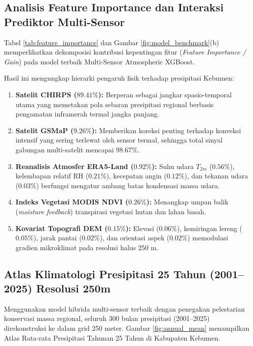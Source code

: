 \documentclass[11pt,a4paper,titlepage]{article}
\begin{document}
\subsection{Analisis Feature Importance dan Interaksi Prediktor Multi-Sensor}
Tabel \ref{tab:feature_importance} dan Gambar \ref{fig:model_benchmark}(b) memperlihatkan dekomposisi kontribusi kepentingan fitur (\textit{Feature Importance / Gain}) pada model terbaik Multi-Sensor Atmospheric XGBoost.



Hasil ini mengungkap hierarki pengaruh fisik terhadap presipitasi Kebumen:
\begin{enumerate}
    \item \textbf{Satelit CHIRPS ($89.41\%$):} Berperan sebagai jangkar spasio-temporal utama yang memetakan pola sebaran presipitasi regional berbasis pengamatan inframerah termal jangka panjang.
    \item \textbf{Satelit GSMaP ($9.26\%$):} Memberikan koreksi penting terhadap konveksi intensif yang sering terlewat oleh sensor termal, sehingga total sinyal gabungan multi-satelit mencapai $98.67\%$.
    \item \textbf{Reanalisis Atmosfer ERA5-Land ($0.92\%$):} Suhu udara $T_{2m}$ ($0.56\%$), kelembapan relatif $\text{RH}$ ($0.21\%$), kecepatan angin ($0.12\%$), dan tekanan udara ($0.03\%$) berfungsi mengatur ambang batas kondensasi massa udara.
    \item \textbf{Indeks Vegetasi MODIS NDVI ($0.26\%$):} Menangkap umpan balik (\textit{moisture feedback}) transpirasi vegetasi hutan dan lahan basah.
    \item \textbf{Kovariat Topografi DEM ($0.15\%$):} Elevasi ($0.06\%$), kemiringan lereng ($0.05\%$), jarak pantai ($0.02\%$), dan orientasi aspek ($0.02\%$) memodulasi gradien mikroklimat pada resolusi halus $250\text{ m}$.
\end{enumerate}

\subsection{Atlas Klimatologi Presipitasi 25 Tahun (2001--2025) Resolusi 250m}
Menggunakan model hibrida multi-sensor terbaik dengan penegakan pelestarian konservasi massa regional, seluruh 300 bulan presipitasi (2001--2025) direkonstruksi ke dalam grid 250 meter. Gambar \ref{fig:annual_mean} menampilkan Atlas Rata-rata Presipitasi Tahunan 25 Tahun di Kabupaten Kebumen.
\end{document}
